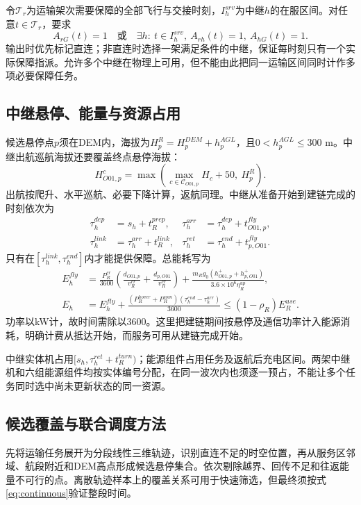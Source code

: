 令$\mathcal T_r$为运输架次需要保障的全部飞行与交接时刻，$I_h^{srv}$为中继$h$的在服区间。对任意$t\in\mathcal T_r$，要求
\begin{equation}
A_{rG}(t)=1\quad\text{或}\quad
\exists h:\ t\in I_h^{srv},\ A_{rh}(t)=1,\ A_{hG}(t)=1.
\label{eq:continuous}
\end{equation}
输出时优先标记直连；非直连时选择一架满足条件的中继，保证每时刻只有一个实际保障指派。允许多个中继在物理上可用，但不能由此把同一运输区间同时计作多项必要保障任务。

\subsection{中继悬停、能量与资源占用}
候选悬停点$p$须在DEM内，海拔为$H_p^R=H_p^{DEM}+h_p^{AGL}$，且$0<h_p^{AGL}\le300$ m。中继出航巡航海拔还要覆盖终点悬停海拔：
\begin{equation}
H_{O01,p}^{c}=\max\left(\max_{c\in\mathcal C_{O01,p}}H_c+50,\ H_p^R\right).
\end{equation}
出航按爬升、水平巡航、必要下降计算，返航同理。中继从准备开始到建链完成的时刻依次为
\begin{align}
\tau_h^{dep}&=s_h+t_R^{prep},&
\tau_h^{arr}&=\tau_h^{dep}+t_{O01,p}^{fly},\\
\tau_h^{link}&=\tau_h^{arr}+t_R^{link},&
\tau_h^{ret}&=\tau_h^{end}+t_{p,O01}^{fly}.
\end{align}
只有在$[\tau_h^{link},\tau_h^{end}]$内才能提供保障。总能耗写为
\begin{align}
E_h^{fly}&=\frac{P_R^{cr}}{3600}\left(\frac{d_{O01,p}}{v_R^{cr}}+\frac{d_{p,O01}}{v_R^{cr}}\right)
+\frac{m_Rg_0(h_{O01,p}^{+}+h_{p,O01}^{+})}{3.6\times10^6\eta_R^{up}},\\
E_h&=E_h^{fly}+\frac{(P_R^{hover}+P_R^{com})(\tau_h^{end}-\tau_h^{arr})}{3600}
\le(1-\rho_R)E_R^{use}.\label{eq:relay-energy}
\end{align}
功率以kW计，故时间需除以3600。这里把建链期间按悬停及通信功率计入能源消耗，明确计费从抵达开始，而服务可用从建链完成开始。

中继实体机占用$[s_h,\tau_h^{ret}+t_R^{turn})$；能源组件占用任务及返航后充电区间。两架中继机和六组能源组件均按实体编号分配，在同一波次内也须逐一预占，不能让多个任务同时选中尚未更新状态的同一资源。

\subsection{候选覆盖与联合调度方法}
先将运输任务展开为分段线性三维轨迹，识别直连不足的时空位置，再从服务区邻域、航段附近和DEM高点形成候选悬停集合。依次剔除越界、回传不足和往返能量不可行的点。离散轨迹样本上的覆盖关系可用于快速筛选，但最终须按式\eqref{eq:continuous}验证整段时间。

